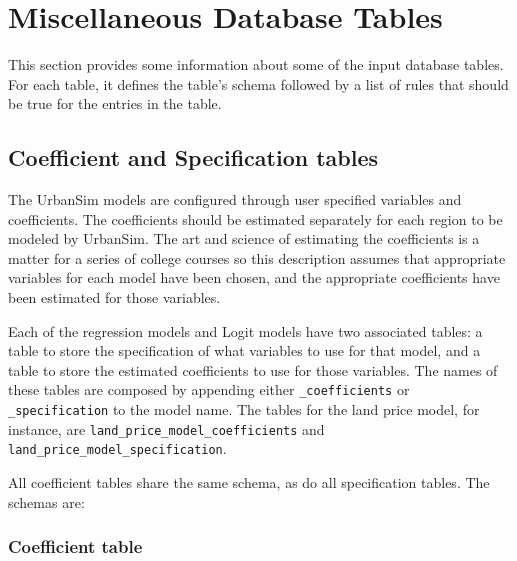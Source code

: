 \section{Miscellaneous Database Tables}

This section provides some information about some of the input database tables.
For each table, it defines the table's schema followed by a list of rules that
should be true for the entries in the table.

\subsection{Coefficient and Specification tables}

The UrbanSim models \modelsindex are configured through user specified
variables and coefficients. \coefficientsindex The coefficients should be
estimated separately for each region to be modeled by UrbanSim. The art and
science of estimating the coefficients is a matter for a series of college
courses so this description assumes that appropriate variables for each model
have been chosen, and the appropriate coefficients have been estimated for
those variables.

Each of the regression models and Logit models have two associated
tables: a table to store the specification of what variables to use
for that model, and a table to store the estimated coefficients to
use for those variables.  The names of these tables are composed by
appending either \verb|_coefficients| or \verb|_specification| to
the model name.  The tables for the land price model, for instance,
are \verb|land_price_model_coefficients| and
\verb|land_price_model_specification|.

All coefficient tables share the same schema, as do all
specification tables. The schemas are:

\subsubsection{Coefficient table}

